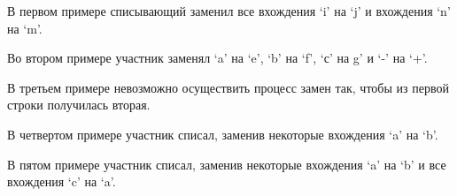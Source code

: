 В первом примере списывающий заменил все вхождения `i' на `j' и вхождения `n' на `m'. 

Во втором примере участник заменял `a' на `e', `b' на `f', `с' на g' и `-' на `+'. 

В третьем примере невозможно осуществить процесс замен так, чтобы из первой строки получилась вторая. 

В четвертом примере участник списал, заменив некоторые вхождения `a' на `b'. 

В пятом примере участник списал, заменив некоторые вхождения `a' на `b' и все вхождения `c' на `a'.
